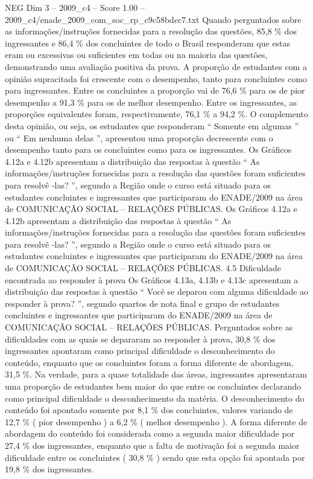 \begin{textsample}{NEG Dim 3 – 2009\_c4 – Score 1.00 – 2009\_c4/enade\_2009\_com\_soc\_rp\_c9c58bdcc7.txt}
Quando perguntados sobre as informações/instruções fornecidas para a resolução das questões, 85,8 \% dos ingressantes e 86,4 \% dos concluintes de todo o Brasil responderam que estas eram ou excessivas ou suficientes em todas ou na maioria das questões, demonstrando uma avaliação positiva da prova.
A proporção de estudantes com a opinião supracitada foi crescente com o desempenho, tanto para concluintes como para ingressantes.
Entre os concluintes a proporção vai de 76,6 \% para os de pior desempenho a 91,3 \% para os de melhor desempenho.
Entre os ingressantes, as proporções equivalentes foram, respectivamente, 76,1 \% a 94,2 \%.
O complemento desta opinião, ou seja, os estudantes que responderam “ Somente em algumas ” ou “ Em nenhuma delas ”, apresentou uma proporção decrescente com o desempenho tanto para os concluintes como para os ingressantes.
Os Gráficos 4.12a e 4.12b apresentam a distribuição das respostas à questão “ As informações/instruções fornecidas para a resolução das questões foram suficientes para resolvê -las? ”, segundo a Região onde o curso está situado para os estudantes concluintes e ingressantes que participaram do ENADE/2009 na área de COMUNICAÇÃO SOCIAL – RELAÇÕES PÚBLICAS.
Os Gráficos 4.12a e 4.12b apresentam a distribuição das respostas à questão “ As informações/instruções fornecidas para a resolução das questões foram suficientes para resolvê -las? ”, segundo a Região onde o curso está situado para os estudantes concluintes e ingressantes que participaram do ENADE/2009 na área de COMUNICAÇÃO SOCIAL – RELAÇÕES PÚBLICAS. 4.5 Dificuldade encontrada ao responder à prova Os Gráficos 4.13a, 4.13b e 4.13c apresentam a distribuição das respostas à questão “ Você se deparou com alguma dificuldade ao responder à prova? ”, segundo quartos de nota final e grupo de estudantes concluintes e ingressantes que participaram do ENADE/2009 na área de COMUNICAÇÃO SOCIAL – RELAÇÕES PÚBLICAS.
Perguntados sobre as dificuldades com as quais se depararam ao responder à prova, 30,8 \% dos ingressantes apontaram como principal dificuldade o desconhecimento do conteúdo, enquanto que os concluintes foram a forma diferente de abordagem, 31,5 \%.
Na verdade, para a quase totalidade das áreas, ingressantes apresentaram uma proporção de estudantes bem maior do que entre os concluintes declarando como principal dificuldade o desconhecimento da matéria.
O desconhecimento do conteúdo foi apontado somente por 8,1 \% dos concluintes, valores variando de 12,7 \% ( pior desempenho ) a 6,2 \% ( melhor desempenho ).
A forma diferente de abordagem do conteúdo foi considerada como a segunda maior dificuldade por 27,4 \% dos ingressantes, enquanto que a falta de motivação foi a segunda maior dificuldade entre os concluintes ( 30,8 \% ) sendo que esta opção foi apontada por 19,8 \% dos ingressantes.

\end{textsample}
